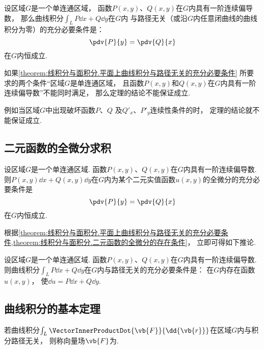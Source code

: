 \begin{theorem}\label{theorem:线积分与面积分.平面上曲线积分与路径无关的充分必要条件}
设区域\(G\)是一个单连通区域，
函数\(P(x,y)\)、\(Q(x,y)\)在\(G\)内具有一阶连续偏导数，
那么曲线积分\(\int_L P\dd{x}+Q\dd{y}\)在\(G\)内
与路径无关（或沿\(G\)内任意闭曲线的曲线积分为零）的充分必要条件是：\[
	\pdv{P}{y}=\pdv{Q}{x}
\]在\(G\)内恒成立.
\end{theorem}

如果\cref{theorem:线积分与面积分.平面上曲线积分与路径无关的充分必要条件}
所要求的两个条件“区域\(G\)是单连通区域，
且函数\(P(x,y)\)和\(Q(x,y)\)在\(G\)内具有一阶连续偏导数”不能同时满足，
那么定理的结论不能保证成立.

例如当区域\(G\)中出现破坏函数\(P\)、\(Q\)
及\(Q'_x\)、\(P'_y\)连续性条件的时，
定理的结论就不能保证成立.

\subsection{二元函数的全微分求积}
\begin{theorem}\label{theorem:线积分与面积分.二元函数的全微分的存在条件}
设区域\(G\)是一个单连通区域.
函数\(P(x,y)\)、\(Q(x,y)\)在\(G\)内具有一阶连续偏导数.
则\(P(x,y)\dd{x}+Q(x,y)\dd{y}\)在\(G\)内为某个二元实值函数\(u(x,y)\)的全微分的充分必要条件是\[
	\pdv{P}{y}=\pdv{Q}{x}
\]在\(G\)内恒成立.
\end{theorem}

根据\cref{theorem:线积分与面积分.平面上曲线积分与路径无关的充分必要条件,theorem:线积分与面积分.二元函数的全微分的存在条件}，
立即可得如下推论.
\begin{corollary}
设区域\(G\)是一个单连通区域.
函数\(P(x,y)\)、\(Q(x,y)\)在\(G\)内具有一阶连续偏导数.
则曲线积分\(\int_L P\dd{x}+Q\dd{y}\)在\(G\)内与路径无关的充分必要条件是：
在\(G\)内存在函数\(u(x,y)\)，
使\(\dd{u}=P\dd{x}+Q\dd{y}\).
\end{corollary}

\subsection{曲线积分的基本定理}
\begin{definition}
若曲线积分\(\int_L \VectorInnerProductDot{\vb{F}}{\dd{\vb{r}}}\)在区域\(G\)内与积分路径无关，
则称向量场\(\vb{F}\)为.
\end{definition}

